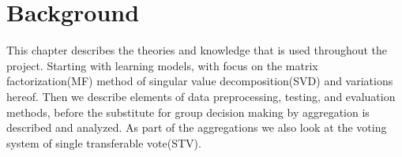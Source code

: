 \chapter{Background}

This chapter describes the theories and knowledge that is used throughout the project. Starting with learning models, with focus on the matrix factorization(MF) method of singular value decomposition(SVD) and variations hereof. Then we describe elements of data preprocessing, testing, and evaluation methods, before the substitute for group decision making by aggregation is described and analyzed. As part of the aggregations we also look at the voting system of single transferable vote(STV).




